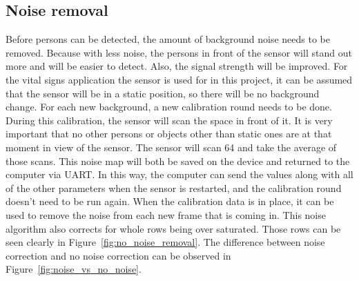 
\subsection{Noise removal}
Before persons can be detected, the amount of background noise needs to be removed. Because with less noise, the persons in front of the sensor will stand out more and will be easier to detect. Also, the signal strength will be improved. For the vital signs application the sensor is used for in this project, it can be assumed that the sensor will be in a static position, so there will be no background change. For each new background, a new calibration round needs to be done. During this calibration, the sensor will scan the space in front of it. It is very important that no other persons or objects other than static ones are at that moment in view of the sensor. The sensor will scan 64 and take the average of those scans. This noise map will both be saved on the device and returned to the computer via UART. In this way, the computer can send the values along with all of the other parameters when the sensor is restarted, and the calibration round doesn't need to be run again. When the calibration data is in place, it can be used to remove the noise from each new frame that is coming in. This noise algorithm also corrects for whole rows being over saturated. Those rows can be seen clearly in Figure~\ref{fig:no_noise_removal}. The difference between noise correction and no noise correction can be observed in Figure~\ref{fig:noise_vs_no_noise}.

